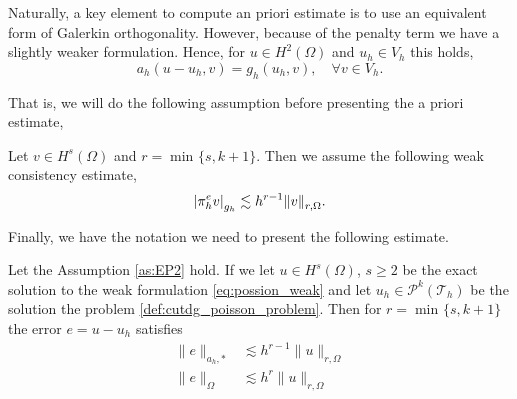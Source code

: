 Naturally, a key element to compute an priori estimate is to use an equivalent form of Galerkin orthogonality. However, because of the penalty term we have a slightly weaker formulation. Hence, for $u \in H^{2}( \Omega ) $ and $u_{h} \in V_{h}$
this holds, \[
a_{h}( u - u_{h}, v) = g_{h}( u_{h},v), \quad  \forall v \in  V_{h}.
\]



That is, we will do the following assumption before presenting the a priori estimate,
\begin{assumption}[EP2]
    \label{as:EP2}
    Let $v \in H^{s}( \Omega )  $  and $r = \min_{} \{ s, k+1 \}$.  Then we assume the following weak consistency estimate, \[
    \left\lvert  \pi ^{e}_{h} v  \right\rvert _{g_{h}} \lesssim  h^{r-1}\| v \|_{ r,\Omega  }^{  }.
    \]
\end{assumption}

Finally, we have the notation we need to present the following estimate.

\begin{theorem}
    Let the Assumption \ref{as:EP2} hold. If we let $u \in H^{s}( \Omega ) $, $s\ge 2$ be the exact solution to the weak formulation \eqref{eq:possion_weak} and let $u_{h} \in \mathcal{P}^{k}( \mathcal{T} _{h})  $ be the solution the problem \ref{def:cutdg_poisson_problem}. Then for $r =
    \min_{}\{s, k+1\} $ the error $e = u - u_{h}$ satisfies
    \begin{align}
        \label{eq:apriori_1}
            \| e \|_{ a_{h},* }^{  } &\lesssim   h^{r-1} \| u \|_{ r,\Omega  }^{  }\\
        \label{eq:apriori_2}
            \| e \|_{ \Omega  }^{  } &\lesssim   h^{r} \| u \|_{ r,\Omega  }^{  }
    \end{align}
\end{theorem}

